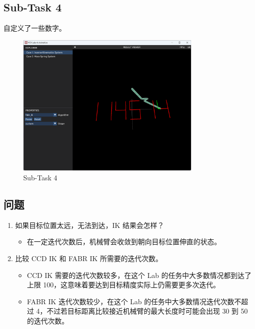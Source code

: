 \documentclass[UTF8]{ctexart}
\begin{document}
\subsection*{Sub-Task 4}

自定义了一些数字。

\begin{figure}[htbp]
    \centering
    \includegraphics[width=0.8\textwidth]{images/1-3.png}
    \caption*{Sub-Task 4}
\end{figure}

\subsection*{问题}

\begin{enumerate}
    \item {\kaishu 如果目标位置太远，无法到达，IK 结果会怎样？}
    \begin{itemize}
        \item 在一定迭代次数后，机械臂会收敛到朝向目标位置伸直的状态。
    \end{itemize}
    \item {\kaishu 比较 CCD IK 和 FABR IK 所需要的迭代次数。}
    \begin{itemize}
        \item CCD IK 需要的迭代次数较多，在这个 Lab 的任务中大多数情况都到达了上限 100，这意味着要达到目标精度实际上仍需要更多次迭代。
        \item FABR IK 迭代次数较少，在这个 Lab 的任务中大多数情况迭代次数不超过 4，不过若目标距离比较接近机械臂的最大长度时可能会出现 30 到 50 的迭代次数。
    \end{itemize}
\end{enumerate}
\end{document}

